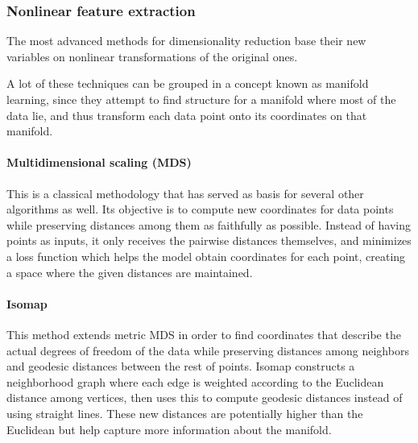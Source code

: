 \documentclass[
	fontsize=11pt, %
	twoside=false, %
	open=any, %
	secnumdepth=1, %
]{kaobook}
\newcommand{\change}[1]{{\color{blue}#1}}
\renewcommand{\change}[1]{#1}
\begin{document}

\subsubsection{Nonlinear feature extraction}

The most advanced methods for dimensionality reduction base their new variables on nonlinear transformations of the original ones.

A lot of these techniques can be grouped in a concept known as manifold learning, since they attempt to find structure for a manifold where most of the data lie, and thus transform each data point onto its coordinates on that manifold.

\paragraph*{Multidimensional scaling (MDS) \cite{borg2005modern}}
This is a classical methodology that has served as basis for several other algorithms as well. Its objective is to compute new coordinates for data points while preserving distances among them as faithfully as possible. Instead of having points as inputs, it only receives the pairwise distances themselves, and minimizes a loss function which helps the model obtain coordinates for each point, creating a space where the given distances are maintained. %


\paragraph*{Isomap \cite{Isomap}} This method extends metric MDS in order to find coordinates that describe the actual degrees of freedom of the data while preserving distances among neighbors and geodesic distances between the rest of points. %
Isomap constructs a neighborhood graph where each edge is weighted according to the Euclidean distance among vertices\change{, then uses this} to compute geodesic distances instead of using straight lines. These new distances are potentially higher than the Euclidean but help capture more information about the manifold.
\end{document}
